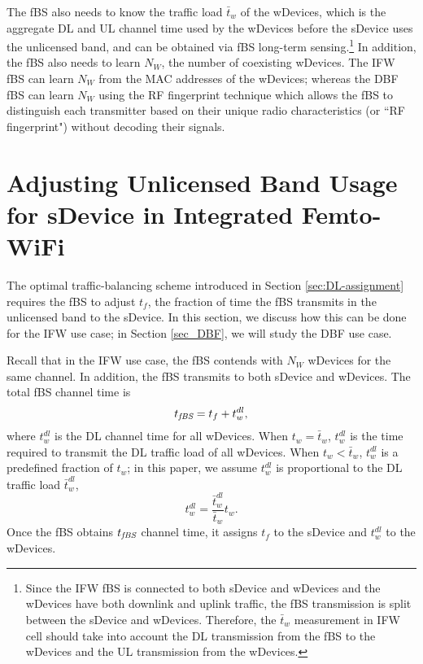 \documentclass[journal,final,letterpaper,10pt,doublecolumn,twoside]{IEEEtran}
\begin{document}
The fBS also needs to know the traffic load $\bar{t}_w $ of the
wDevices, which is the aggregate DL and UL channel time used by the wDevices before
the sDevice uses the unlicensed band, and can be obtained via fBS
long-term sensing.\footnote{Since the IFW fBS is connected to both sDevice and wDevices and the wDevices have both downlink and uplink traffic, the fBS transmission is split between the sDevice and wDevices. Therefore, the $\bar{t}_w $  measurement in IFW cell should take into account the DL transmission from the fBS to the wDevices and the UL transmission from the wDevices.} In addition, the fBS also needs to learn $N_W$,
the number of coexisting wDevices.  The IFW fBS can learn $N_W$
from the MAC addresses of the wDevices; whereas the DBF fBS can
learn $N_W$  using the RF fingerprint technique
\cite{RF-fingerprint} which allows the fBS to distinguish each
transmitter based on their unique radio characteristics (or ``RF
fingerprint") without decoding their signals.


\section{Adjusting Unlicensed Band Usage for sDevice in Integrated  Femto-WiFi}\label{sec_IFW}

The optimal traffic-balancing scheme introduced in Section \ref{sec:DL-assignment} requires the fBS to adjust $t_f$, the fraction of time the fBS transmits in the unlicensed band to the sDevice. In this section, we discuss how this can be done for the  IFW use case; in Section \ref{sec_DBF}, we will study the DBF use case.

Recall that in the IFW use case, the fBS contends with $N_W$ wDevices for the same channel. In addition, the fBS transmits to both sDevice and wDevices. The total fBS channel time is
\begin{equation}
t_{\emph{fBS}} = t_f + t_w^{dl} ,
 \label{eq:t_fBS}
\end{equation}
where  $t_w^{dl}$ is the DL channel time for all wDevices. When $t_w=\bar{t}_w$, $t_w^{dl}$ is the time required to transmit the DL traffic load of all wDevices.   When $t_w<\bar{t}_w$,  $t_w^{dl}$ is a predefined fraction of $t_w$; in this paper, we assume $t_w^{dl}$ is proportional to the DL traffic load $\bar{t}_w^{dl}$,
\begin{equation}
t_w^{dl} = \frac{\bar{t}_w^{dl}}{\bar{t}_w} t_w.
 \label{eq:t_wdl}
\end{equation}
Once the fBS obtains $t_{\emph{fBS}}$ channel time, it assigns $t_f$ to the sDevice and $t_w^{dl}$ to the wDevices.
\end{document}
